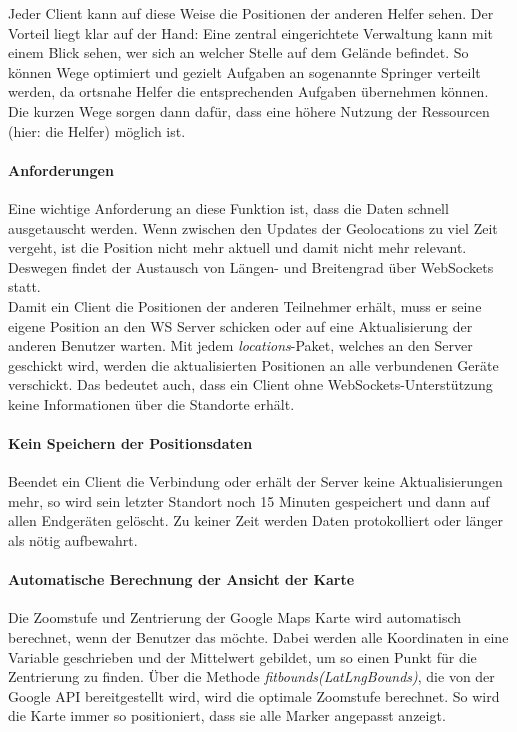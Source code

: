 Jeder Client kann auf diese Weise die Positionen der anderen Helfer sehen. Der Vorteil liegt klar auf der Hand: Eine zentral eingerichtete Verwaltung kann mit einem Blick sehen, wer sich an welcher Stelle auf dem Gelände befindet. So können Wege optimiert und gezielt Aufgaben an sogenannte Springer verteilt werden, da ortsnahe Helfer die entsprechenden Aufgaben übernehmen können. Die kurzen Wege sorgen dann dafür, dass eine höhere Nutzung der Ressourcen (hier: die Helfer) möglich ist.\par

\paragraph{Anforderungen}
Eine wichtige Anforderung an diese Funktion ist, dass die Daten schnell ausgetauscht werden. Wenn zwischen den Updates der Geolocations zu viel Zeit vergeht, ist die Position nicht mehr aktuell und damit nicht mehr relevant. Deswegen findet der Austausch von Längen- und Breitengrad über WebSockets statt.\\
Damit ein Client die Positionen der anderen Teilnehmer erhält, muss er seine eigene Position an den WS Server schicken oder auf eine Aktualisierung der anderen Benutzer warten. Mit jedem \emph{locations}-Paket, welches an den Server geschickt wird, werden die aktualisierten Positionen an alle verbundenen Geräte verschickt. Das bedeutet auch, dass ein Client ohne WebSockets-Unterstützung keine Informationen über die Standorte erhält.

\paragraph{Kein Speichern der Positionsdaten}
Beendet ein Client die Verbindung oder erhält der Server keine Aktualisierungen mehr, so wird sein letzter Standort noch 15 Minuten gespeichert und dann auf allen Endgeräten gelöscht. Zu keiner Zeit werden Daten protokolliert oder länger als nötig aufbewahrt.

\paragraph{Automatische Berechnung der Ansicht der Karte}
Die Zoomstufe und Zentrierung der Google Maps Karte wird automatisch berechnet, wenn der Benutzer das möchte. Dabei werden alle Koordinaten in eine Variable geschrieben und der Mittelwert gebildet, um so einen Punkt für die Zentrierung zu finden. Über die Methode \emph{fitbounds(LatLngBounds)}, die von der Google API bereitgestellt wird, wird die optimale Zoomstufe berechnet. So wird die Karte immer so positioniert, dass sie alle Marker angepasst anzeigt.

